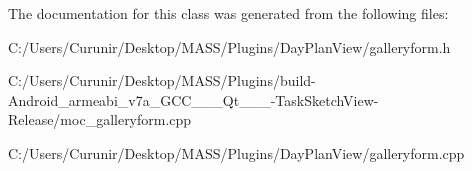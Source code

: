 The documentation for this class was generated from the following files\+:\begin{DoxyCompactItemize}
\item 
C\+:/\+Users/\+Curunir/\+Desktop/\+M\+A\+S\+S/\+Plugins/\+Day\+Plan\+View/galleryform.\+h\item 
C\+:/\+Users/\+Curunir/\+Desktop/\+M\+A\+S\+S/\+Plugins/build-\/\+Android\+\_\+armeabi\+\_\+v7a\+\_\+\+G\+C\+C\+\_\+\_\+\_\+\+Qt\+\_\+\_\+\_-\/\+Task\+Sketch\+View-\/\+Release/moc\+\_\+galleryform.\+cpp\item 
C\+:/\+Users/\+Curunir/\+Desktop/\+M\+A\+S\+S/\+Plugins/\+Day\+Plan\+View/galleryform.\+cpp\end{DoxyCompactItemize}
